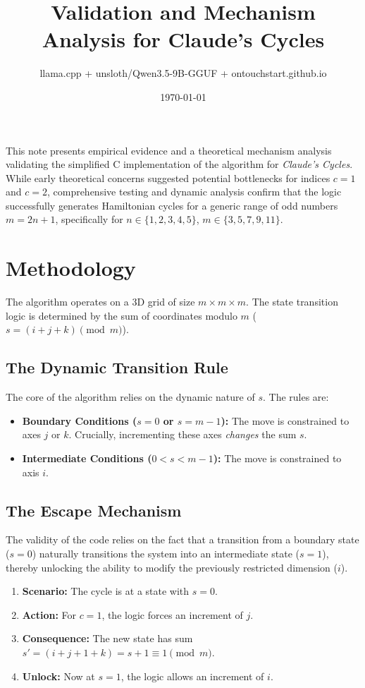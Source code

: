 \documentclass[10pt, letterpaper]{article}
\title{\textbf{Validation and Mechanism Analysis for \textbf{Claude's Cycles}}}
\author{llama.cpp + unsloth/Qwen3.5-9B-GGUF + ontouchstart.github.io}
\date{\today}
\begin{document}
\maketitle

This note presents empirical evidence and a theoretical mechanism analysis validating the simplified C implementation of the algorithm for \textit{Claude's Cycles}. While early theoretical concerns suggested potential bottlenecks for indices $c=1$ and $c=2$, comprehensive testing and dynamic analysis confirm that the logic successfully generates Hamiltonian cycles for a generic range of odd numbers $m = 2n + 1$, specifically for $n \in \{1, 2, 3, 4, 5\}$, $m \in \{3, 5, 7, 9, 11\}$.

\section{Methodology}

The algorithm operates on a 3D grid of size $m \times m \times m$. The state transition logic is determined by the sum of coordinates modulo $m$ ($s = (i+j+k) \pmod m$).

\subsection{The Dynamic Transition Rule}
The core of the algorithm relies on the dynamic nature of $s$. The rules are:
\begin{itemize}
    \item \textbf{Boundary Conditions ($s=0$ or $s=m-1$):} The move is constrained to axes $j$ or $k$. Crucially, incrementing these axes \textit{changes} the sum $s$.
    \item \textbf{Intermediate Conditions ($0 < s < m-1$):} The move is constrained to axis $i$.
\end{itemize}

\subsection{The Escape Mechanism}
The validity of the code relies on the fact that a transition from a boundary state ($s=0$) naturally transitions the system into an intermediate state ($s=1$), thereby unlocking the ability to modify the previously restricted dimension ($i$).

\begin{enumerate}
    \item \textbf{Scenario:} The cycle is at a state with $s=0$.
    \item \textbf{Action:} For $c=1$, the logic forces an increment of $j$.
    \item \textbf{Consequence:} The new state has sum $s' = (i + j + 1 + k) = s + 1 \equiv 1 \pmod m$.
    \item \textbf{Unlock:} Now at $s=1$, the logic allows an increment of $i$.
\end{enumerate}
\end{document}
